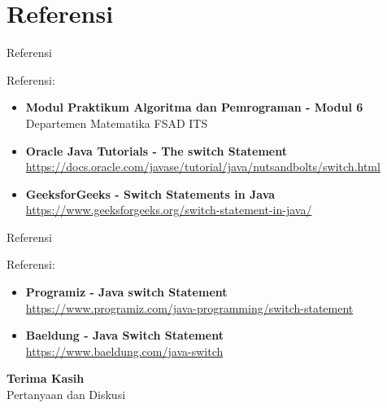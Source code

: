 \documentclass{beamer}
\begin{document}
\section{Referensi}
\begin{frame}{Referensi}
  \begin{block}{Referensi:}
    \begin{itemize}
      \item \textbf{Modul Praktikum Algoritma dan Pemrograman - Modul 6}\\
            Departemen Matematika FSAD ITS
      \item \textbf{Oracle Java Tutorials - The switch Statement}\\
            \url{https://docs.oracle.com/javase/tutorial/java/nutsandbolts/switch.html}
      \item \textbf{GeeksforGeeks - Switch Statements in Java}\\
            \url{https://www.geeksforgeeks.org/switch-statement-in-java/}
    \end{itemize}
  \end{block}
\end{frame}

\begin{frame}{Referensi}
  \begin{block}{Referensi:}
    \begin{itemize}
      \item \textbf{Programiz - Java switch Statement}\\
            \url{https://www.programiz.com/java-programming/switch-statement}
      \item \textbf{Baeldung - Java Switch Statement}\\
            \url{https://www.baeldung.com/java-switch}
    \end{itemize}
  \end{block}
\end{frame}

\begin{frame}[standout]
  \Huge \textbf{Terima Kasih} \\[1.5em]
  \Large Pertanyaan dan Diskusi
\end{frame}
\end{document}
